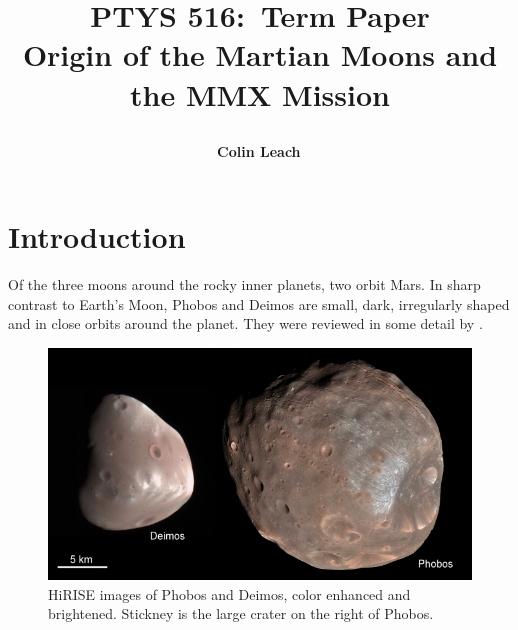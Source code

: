 

\newcommand{\hmwkClass}{PTYS 516}
\newcommand{\hmwkTitle}{Term Paper\\Origin of the Martian Moons and the MMX Mission}
\title{\vspace{-2cm}\textmd{\textbf{\hmwkClass:\ \hmwkTitle}}\\\normalsize \vspace{0.1in}
	\author{\textbf{Colin Leach}\,}} \vspace{-0.3in}



\renewcommand{\arraystretch}{1.2}

\usepackage{makecell}
\usepackage{orcidlink}



	
\maketitle
\vspace{-0.4in}


\section{Introduction}\label{section:intro}

Of the three moons around the rocky inner planets, two orbit Mars. In sharp contrast to Earth's Moon, Phobos and Deimos are small, dark, irregularly shaped and in close orbits around the planet. They were reviewed in some detail by \citet{murchie_phobos_2015}.

\begin{figure}[h!]
	\caption{HiRISE images of Phobos and Deimos, color enhanced and brightened. Stickney is the large crater on the right of Phobos.}
	\label{fig:ph_de}
	\includegraphics[scale=0.65]{Phobos_deimos}
\end{figure}

